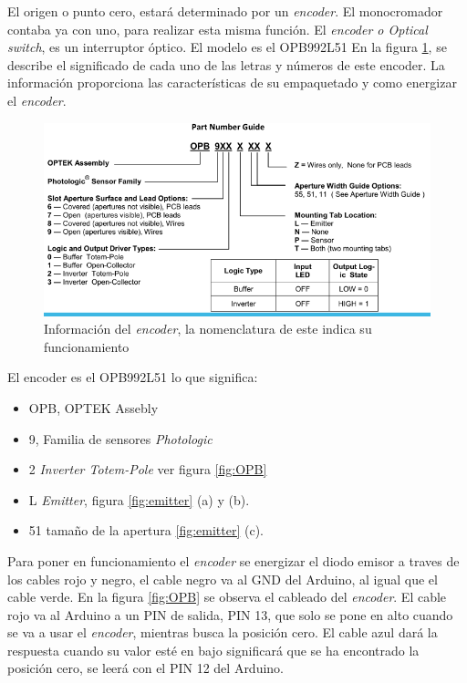 El origen o punto cero, estará determinado por un \textit{encoder}. El monocromador contaba ya con uno, para realizar esta misma función. El \textit{encoder o Optical switch}, es un interruptor óptico. El modelo es el OPB992L51
En la figura \ref{fig:encoder}, se describe el significado de cada uno de las letras y números de este encoder. La información proporciona las características de su empaquetado y como energizar el \textit{encoder}.
\begin{figure}[h]
	\centering
	\includegraphics[width=0.8\linewidth]{Imagenes/3/Encoder}
	\caption{Información del \textit{encoder}, la nomenclatura de este indica su funcionamiento \cite{OPB992}}
	\label{fig:encoder}
\end{figure}
El encoder es el OPB992L51 lo que significa:
\begin{itemize}
	\item OPB, OPTEK Assebly
	\item 9, Familia de sensores \textit{Photologic}
	\item 2 \textit{Inverter Totem-Pole} ver figura \ref{fig:OPB}
	\item L \textit{Emitter}, figura \ref{fig:emitter} (a) y (b).
	\item 51 tamaño de la apertura \ref{fig:emitter} (c).
\end{itemize}
Para poner en funcionamiento el \textit{encoder} se energizar el diodo emisor a traves de los cables rojo y negro, el cable negro va al GND del Arduino, al igual que el cable verde. En la figura \ref{fig:OPB} se observa el cableado del \textit{encoder}. El cable rojo va al Arduino a un PIN de salida, PIN 13, que solo se pone en alto cuando se va a usar el \textit{encoder}, mientras busca la posición cero. El cable azul dará la respuesta cuando su valor esté en bajo significará que se ha encontrado la posición cero, se leerá con el PIN 12 del Arduino.

